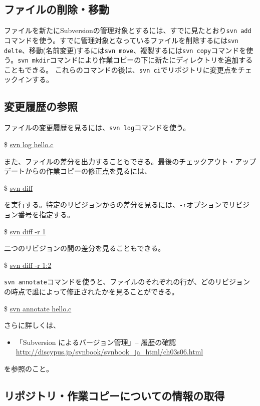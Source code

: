 \documentclass[a4j]{jsbook}
\newcommand{\prompt}{\$ }
\newenvironment{commandline2}{%
  \begin{tcolorbox}\tt%
}{%
  \end{tcolorbox}%
}
\begin{document}
\subsection{ファイルの削除・移動}

ファイルを新たにSubversionの管理対象とするには、すでに見たとおり{\tt svn add}コマンドを使う。すでに管理対象となっているファイルを削除するには{\tt svn delte}、移動(名前変更)するには{\tt svn move}、複製するには{\tt svn copy}コマンドを使う。{\tt svn mkdir}コマンドにより作業コピーの下に新たにディレクトリを追加することもできる。
これらのコマンドの後は、{\tt svn ci}でリポジトリに変更点をチェックインする。

\subsection{変更履歴の参照}

ファイルの変更履歴を見るには、{\tt svn log}コマンドを使う。
\begin{commandline2}
\prompt \underline{svn log hello.c}
\end{commandline2} \noindent
また、ファイルの差分を出力することもできる。最後のチェックアウト・アップデートからの作業コピーの修正点を見るには、
\begin{commandline2}
\prompt \underline{svn diff}
\end{commandline2} \noindent
を実行する。特定のリビジョンからの差分を見るには、{\tt -r}オプションでリビジョン番号を指定する。
\begin{commandline2}
\prompt \underline{svn diff -r 1}
\end{commandline2} \noindent
二つのリビジョンの間の差分を見ることもできる。
\begin{commandline2}
\prompt \underline{svn diff -r 1:2}
\end{commandline2} \noindent
{\tt svn annotate}コマンドを使うと、ファイルのそれぞれの行が、どのリビジョンの時点で誰によって修正されたかを見ることができる。
\begin{commandline2}
\prompt \underline{svn annotate hello.c}
\end{commandline2} \noindent
さらに詳しくは、
\begin{itemize}
  \item 「Subversion によるバージョン管理」-- 履歴の確認 \\
    {\small \url{http://discypus.jp/svnbook/svnbook_ja_html/ch03s06.html}}
\end{itemize}
を参照のこと。

\subsection{リポジトリ・作業コピーについての情報の取得}
\end{document}
